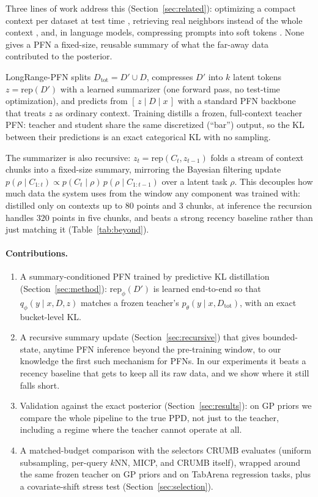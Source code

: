 \documentclass{article}
\newcommand{\Dtot}{D_{\mathrm{tot}}}
\newcommand{\Dfar}{D'}
\newcommand{\Dloc}{D}
\newcommand{\rep}{\mathrm{rep}}
\begin{document}
Three lines of work address this (Section~\ref{sec:related}): optimizing a
compact context per dataset at test time
\citep{feuer2024tunetables, ma2024icd}, retrieving real neighbors instead of
the whole context \citep{thomas2024localpfn}, and, in language models,
compressing prompts into soft tokens
\citep{mu2023gisting, ge2023icae, chevalier2023autocompressors}. None gives
a PFN a fixed-size, reusable summary of what the far-away data contributed
to the posterior.

LongRange-PFN splits $\Dtot = \Dfar \cup \Dloc$,
compresses $\Dfar$ into $k$ latent tokens $z = \rep(\Dfar)$ with a learned
summarizer (one forward pass, no test-time optimization), and predicts from
$[\,z \mid \Dloc \mid x\,]$ with a standard PFN backbone that treats $z$ as
ordinary context. Training distills a frozen, full-context teacher PFN:
teacher and student share the same discretized (``bar'') output, so the KL
between their predictions is an exact categorical KL with no sampling.

The summarizer is also recursive: $z_t = \rep(C_t, z_{t-1})$ folds a stream
of context chunks into a fixed-size summary, mirroring the Bayesian
filtering update $p(\rho \mid C_{1:t}) \propto p(C_t \mid \rho)\,
p(\rho \mid C_{1:t-1})$ over a latent task $\rho$. This decouples how much
data the system uses from the window any component was trained with:
distilled only on contexts up to $80$ points and $3$ chunks, at inference
the recursion handles $320$ points in five chunks, and beats a strong
recency baseline rather than just matching it (Table~\ref{tab:beyond}).

\paragraph{Contributions.}
\begin{enumerate}
  \item A summary-conditioned PFN trained by predictive KL distillation
  (Section~\ref{sec:method}): $\rep_\phi(\Dfar)$ is learned end-to-end so
  that $q_\phi(y \mid x, \Dloc, z)$ matches a frozen teacher's
  $p_\theta(y \mid x, \Dtot)$, with an exact bucket-level KL.
  \item A recursive summary update (Section~\ref{sec:recursive}) that gives
  bounded-state, anytime PFN inference beyond the pre-training window,
  to our knowledge the first such mechanism for PFNs. In our experiments it
  beats a recency baseline that gets to keep all its raw data, and we show
  where it still falls short.
  \item Validation against the exact posterior (Section~\ref{sec:results}):
  on GP priors we compare the whole pipeline to the true PPD, not just to
  the teacher, including a regime where the teacher cannot operate at all.
  \item A matched-budget comparison with the selectors CRUMB evaluates
  (uniform subsampling, per-query $k$NN, MICP, and CRUMB itself), wrapped
  around the same frozen teacher on GP priors and on TabArena regression
  tasks, plus a covariate-shift stress test (Section~\ref{sec:selection}).
\end{enumerate}
\end{document}
